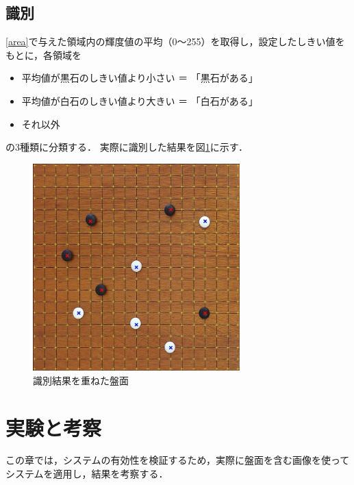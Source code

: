 \documentclass[openright]{nitocs}
\numberwithin{equation}{section}
\begin{document}
        \subsection{識別} \label{identify}  
            \ref{area}で与えた領域内の輝度値の平均（0～255）を取得し，設定したしきい値をもとに，各領域を
            \begin{itemize} %
                \item 平均値が黒石のしきい値より小さい ＝ 「黒石がある」
                \item 平均値が白石のしきい値より大きい ＝ 「白石がある」
                \item それ以外
            \end{itemize}
            の3種類に分類する．
            実際に識別した結果を図\ref{result}に示す．

            \begin{figure}[tb] %
                \begin{center}
                \includegraphics[clip,width=80mm]{result.jpg} 
                \caption{識別結果を重ねた盤面}
                \label{result}
                \end{center}
            \end{figure}

    \section{実験と考察} %
        この章では，システムの有効性を検証するため，実際に盤面を含む画像を使ってシステムを適用し，結果を考察する．
\end{document}
